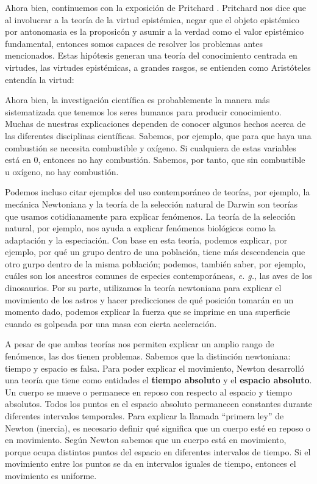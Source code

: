 \documentclass[12pt]{article}
\begin{document}
Ahora bien, continuemos con la exposición de Pritchard \cite{Pritchard2021}. Pritchard nos dice que al involucrar a la teoría de la virtud epistémica, negar que el objeto epistémico por antonomasia es la proposicón y asumir a la verdad como el valor epistémico fundamental, entonces somos capaces de resolver los problemas antes mencionados. Estas hipótesis generan una teoría del conocimiento centrada en virtudes, las virtudes epistémicas, a grandes rasgos, se entienden como Aristóteles entendía la virtud: 

Ahora bien, la investigación científica es probablemente la manera más sistematizada que tenemos los seres humanos para producir conocimiento. Muchas de nuestras explicaciones dependen de conocer algunos hechos acerca de las diferentes disciplinas científicas. Sabemos, por ejemplo, que para que haya una combustión se necesita combustible y oxígeno. Si cualquiera de estas variables está en 0, entonces no hay combustión. Sabemos, por tanto, que sin combustible u oxígeno, no hay combustión.

Podemos incluso citar ejemplos del uso contemporáneo de teorías, por ejemplo, la mecánica Newtoniana y la teoría de la selección natural de Darwin son teorías que usamos cotidianamente para explicar fenómenos. La teoría de la selección natural, por ejemplo, nos ayuda a explicar fenómenos biológicos como la adaptación y la especiación. Con base en esta teoría, podemos explicar, por ejemplo, por qué un grupo dentro de una población, tiene más descendencia que otro gurpo dentro de la misma población; podemos, también saber, por ejemplo, cuáles son los ancestros comunes de especies contemporáneas, \textit{e. g.}, las aves de los dinosaurios. Por su parte, utilizamos la teoría newtoniana para explicar el movimiento de los astros y hacer predicciones de qué posición tomarán en un momento dado, podemos explicar la fuerza que se imprime en una superficie cuando es golpeada por una masa con cierta aceleración.

A pesar de que ambas teorías nos permiten explicar un amplio rango de fenómenos, las dos tienen problemas. Sabemos que la distinción newtoniana: tiempo y espacio es falsa. Para poder explicar el movimiento, Newton desarrolló una teoría que tiene como entidades el \textbf{tiempo absoluto} y el \textbf{espacio absoluto}. Un cuerpo se mueve o permanece en reposo con respecto al espacio y tiempo absolutos. Todos los puntos en el espacio absoluto permanecen constantes durante diferentes intervalos temporales. Para explicar la llamada ``primera ley''  de Newton (inercia), es necesario definir qué significa que un cuerpo esté en reposo o en movimiento. Según Newton sabemos que un cuerpo está en movimiento, porque ocupa distintos puntos del espacio en diferentes intervalos de tiempo. Si el movimiento entre los puntos se da en intervalos iguales de tiempo, entonces el movimiento es uniforme. 
\end{document}
